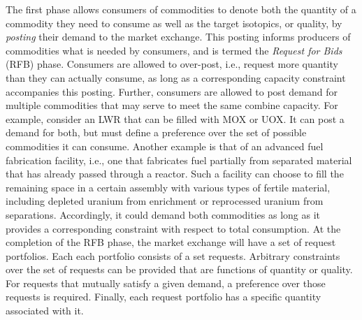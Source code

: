 The first phase allows consumers of commodities to denote both the quantity of a
commodity they need to consume as well as the target isotopics, or quality, by
\textit{posting} their demand to the market exchange. This posting informs
producers of commodities what is needed by consumers, and is termed the
\textit{Request for Bids} (RFB) phase. Consumers are allowed to over-post, i.e.,
request more quantity than they can actually consume, as long as a corresponding
capacity constraint accompanies this posting. Further, consumers are allowed to
post demand for multiple commodities that may serve to meet the same combine
capacity. For example, consider an LWR that can be filled with MOX or UOX. It
can post a demand for both, but must define a preference over the set of
possible commodities it can consume. Another example is that of an advanced fuel
fabrication facility, i.e., one that fabricates fuel partially from separated
material that has already passed through a reactor. Such a facility can choose
to fill the remaining space in a certain assembly with various types of fertile
material, including depleted uranium from enrichment or reprocessed uranium from
separations. Accordingly, it could demand both commodities as long as it
provides a corresponding constraint with respect to total consumption. At the
completion of the RFB phase, the market exchange will have a set of request
portfolios. Each each portfolio consists of a set requests. Arbitrary
constraints over the set of requests can be provided that are functions of
quantity or quality.  For requests that mutually satisfy a given demand, a
preference over those requests is required. Finally, each request portfolio has
a specific quantity associated with it.


